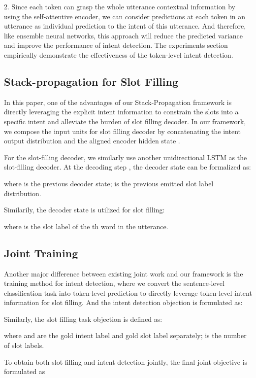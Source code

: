 \documentclass[11pt,a4paper]{article}
\begin{document}
2. Since each token can grasp the whole utterance contextual information by using the self-attentive encoder, 
we can consider predictions at each token in an utterance as individual prediction to the intent of this utterance.
And therefore, like ensemble neural networks, this approach will reduce the 
predicted variance and improve the performance of intent detection.
The experiments section empirically demonstrate the effectiveness of the token-level intent detection.

\subsection{Stack-propagation for Slot Filling}
In this paper, one of the advantages of our Stack-Propagation framework is directly
leveraging the explicit intent information to constrain the slots into a specific intent and alleviate the burden of slot filling decoder.
In our framework,
we compose the input units for slot filling decoder by 
concatenating the intent output distribution  
and the aligned encoder hidden state .

For the slot-filling decoder, we similarly use 
another unidirectional LSTM as the slot-filling decoder. 
At the decoding step , the decoder state  
can be formalized as:

where  is the previous decoder state;  
 is the previous emitted slot label distribution.

Similarily, the decoder state  is utilized for slot filling:

where  is the slot label of the th word in the utterance.
\subsection{Joint Training}
Another major difference between existing joint work \cite{zhang2016joint, goo2018slot} and our framework is the training method for intent detection,
where we convert
the sentence-level classification task into
token-level prediction to directly leverage
token-level intent information for slot filling.
And the intent detection objection is formulated as:


Similarly, the slot filling task objection is defined as: 

where  and 
 are the gold intent label and 
gold slot label separately;  is the number of slot labels.

To obtain both slot filling and intent detection jointly, 
the final joint objective is formulated as
\end{document}
